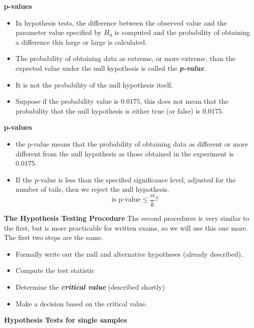 \noindent \textbf{p-values}
\begin{itemize}
\item In hypothesis tests, the difference between the observed value and the parameter value specified by $H_0$ is computed and the probability of obtaining a difference this large or large is calculated.
\item The probability of obtaining data as extreme, or more extreme, than the expected value under the null hypothesis is called the \textbf{\emph{p-value}}.
\item It is not the probability of the null hypothesis itself.
\item Suppose if the probability value is $0.0175$, this does not mean that the probability that the null hypothesis is either true (or false) is $0.0175$.

\end{itemize}


\noindent \textbf{p-values}
\begin{itemize}
\item the p-value means that the probability of obtaining data as different or more different from the null hypothesis as those obtained in the experiment is $0.0175$.
\item If the p-value is less than the specified significance level, adjusted for the number of tails, then we reject the null hypothesis.
\[\mbox{ is p-value} \leq \frac{\alpha}{k} \mbox{?}\]
\end{itemize}



\noindent \textbf{The Hypothesis Testing Procedure }
The second procedures is very similar to the first, but is more practicable for written exams, so we will use this one more. The first two steps are the same.

\begin{itemize}
\item Formally write out the null and alternative hypotheses (already described).
\item Compute the test statistic
\item Determine the \emph{\textbf{critical value}} (described shortly)
\item Make a decision based on the critical value.
\end{itemize}




\noindent \textbf{Hypothesis Tests for single samples}


